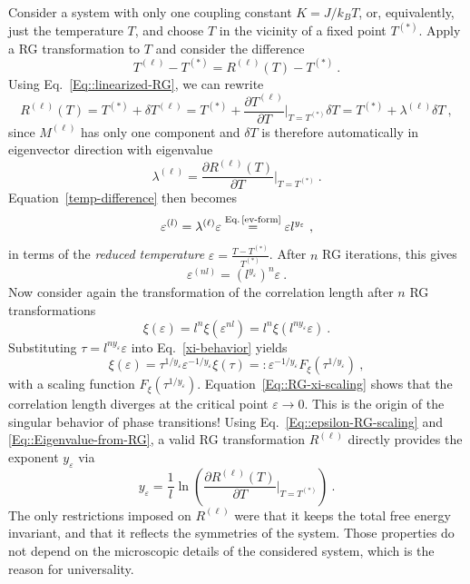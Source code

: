 	Consider a system with only one coupling constant $K = J /	k_B T$, or, equivalently, just the temperature $T$, and choose $T$ in the vicinity of a fixed point $T^{(*)}$. Apply a RG transformation to $T$ and consider the difference
	\begin{equation} \label{temp-difference}
		T^{(\ell)} - T^{(*)} =	R^{(\ell)}(T) - T^{(*)}~.
	\end{equation}
	Using Eq.~\eqref{Eq::linearized-RG}, we can rewrite
	\begin{equation}
		R^{(\ell)}(T) =	T^{(*)} + \delta T^{(\ell)} =	T^{(*)} + \frac{\partial T^{(\ell)}}{\partial T} \bigg |_{T =	T^{(*)}} \delta T =	T^{(*)} + \lambda^{(\ell)} \delta T~,
	\end{equation}
	since $M^{(\ell)}$ has only one component and $\delta T$ is therefore automatically in eigenvector direction with eigenvalue
	\begin{equation} \label{Eq::Eigenvalue-from-RG}
		\lambda^{(\ell)} =	\frac{\partial R^{(\ell)} (T)}{\partial T} \bigg|_{T =	T^{(*)}}~.
	\end{equation}
	Equation~\eqref{temp-difference} then becomes
	\begin{equation} \label{Eq::epsilon-RG-scaling}
		\varepsilon^{(l)} =	\lambda^{(\ell)} \varepsilon \overset{\text{Eq.\,\eqref{ev-form}}}{=} \varepsilon l^{y_\varepsilon}~,
	\end{equation}
	in terms of the \textit{reduced temperature} $ \varepsilon =	\frac{T - T^{(*)}}{T^{(*)}}$. After $n$ RG iterations, this gives
	\begin{equation}
		\varepsilon^{(nl)} = \left( l^{y_\varepsilon}	\right)^n \varepsilon~.
	\end{equation}
	Now consider again the transformation of the correlation length after $n$ RG transformations
	\begin{equation} \label{xi-behavior}
		\xi(\varepsilon) =	l^n \xi(\varepsilon^{nl}) =	l^n \xi( l^{ny_\varepsilon} \varepsilon)~.
	\end{equation}
	Substituting $\tau =	l^{ny_\varepsilon} \varepsilon$ into Eq.~\eqref{xi-behavior} yields
	\begin{equation} \label{Eq::RG-xi-scaling}
		\xi(\varepsilon) =	\tau^{1 / y_\varepsilon} \varepsilon^{-1/ y_\varepsilon} \xi(\tau) =:	\varepsilon^{-{1}/{y_\varepsilon}} F_\xi (\tau^{1 /	y_\varepsilon})~,
	\end{equation}
	with a scaling function $F_\xi (\tau^{1 /	y_\varepsilon})$. Equation~\eqref{Eq::RG-xi-scaling} shows that the correlation length diverges at the critical point $\varepsilon \rightarrow 0$. This is the origin of the singular behavior of phase transitions! Using Eq.~\eqref{Eq::epsilon-RG-scaling} and \eqref{Eq::Eigenvalue-from-RG}, a valid RG transformation $R^{(\ell)}$ directly provides the exponent $y_\varepsilon$ via
	\begin{equation}
		y_\varepsilon =	\frac{1}{l} \ln \left(\frac{\partial R^{(\ell)} (T)}{\partial T} \bigg|_{T	=	T^{(*)}}\right)~.
	\end{equation}
	The only restrictions imposed on $R^{(\ell)}$ were that it keeps the total free energy invariant, and that it reflects the symmetries of the system. Those properties do not depend on the microscopic details of the considered system, which is the reason for universality.
